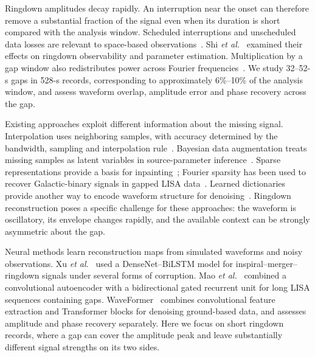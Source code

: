 \documentclass[10pt,prd,aps,a4paper,twocolumn,superscriptaddress,nofootinbib,floatfix]{revtex4-2}
\begin{document}
Ringdown amplitudes decay rapidly. An interruption near the onset can therefore remove a substantial fraction of the signal even when its duration is short compared with the analysis window. Scheduled interruptions and unscheduled data losses are relevant to space-based observations~\cite{Baghi2019,dey2021gaps}. Shi \textit{et al.}~\cite{shi2024effectsdatagapsringdown} examined their effects on ringdown observability and parameter estimation. Multiplication by a gap window also redistributes power across Fourier frequencies~\cite{Harris1978}. We study 32--52-s gaps in 528-s records, corresponding to approximately 6\%--10\% of the analysis window, and assess waveform overlap, amplitude error and phase recovery across the gap.

Existing approaches exploit different information about the missing signal. Interpolation uses neighboring samples, with accuracy determined by the bandwidth, sampling and interpolation rule~\cite{Horowitz1974,Maeland1988,Unser1999}. Bayesian data augmentation treats missing samples as latent variables in source-parameter inference~\cite{Baghi2019}. Sparse representations provide a basis for inpainting~\cite{Starck2010}; Fourier sparsity has been used to recover Galactic-binary signals in gapped LISA data~\cite{Blelly2021}. Learned dictionaries provide another way to encode waveform structure for denoising~\cite{TorresForne2016}. Ringdown reconstruction poses a specific challenge for these approaches: the waveform is oscillatory, its envelope changes rapidly, and the available context can be strongly asymmetric about the gap.

Neural methods learn reconstruction maps from simulated waveforms and noisy observations. Xu \textit{et al.}~\cite{Xu_2024} used a DenseNet--BiLSTM model for inspiral--merger--ringdown signals under several forms of corruption. Mao \textit{et al.}~\cite{Mao:2025cae} combined a convolutional autoencoder with a bidirectional gated recurrent unit for long LISA sequences containing gaps. WaveFormer~\cite{Wang:2024waveformer} combines convolutional feature extraction and Transformer blocks for denoising ground-based data, and assesses amplitude and phase recovery separately. Here we focus on short ringdown records, where a gap can cover the amplitude peak and leave substantially different signal strengths on its two sides.
\end{document}
